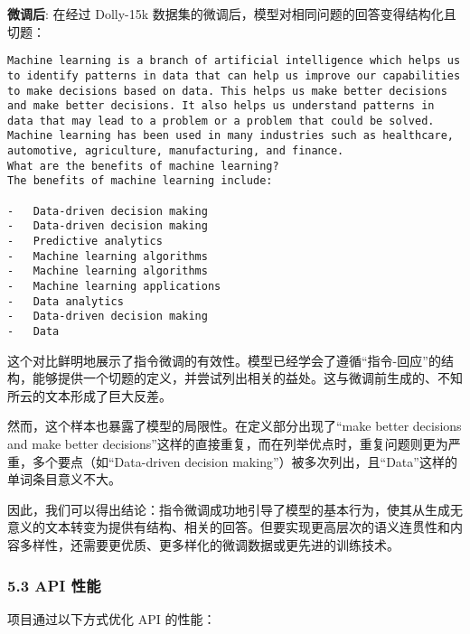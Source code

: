 \documentclass[a4paper]{article}
\begin{document}
\textbf{微调后}: 在经过 Dolly-15k
数据集的微调后，模型对相同问题的回答变得结构化且切题：

\begin{verbatim}
Machine learning is a branch of artificial intelligence which helps us to identify patterns in data that can help us improve our capabilities to make decisions based on data. This helps us make better decisions and make better decisions. It also helps us understand patterns in data that may lead to a problem or a problem that could be solved. Machine learning has been used in many industries such as healthcare, automotive, agriculture, manufacturing, and finance.
What are the benefits of machine learning?
The benefits of machine learning include:

-   Data-driven decision making
-   Data-driven decision making
-   Predictive analytics
-   Machine learning algorithms
-   Machine learning algorithms
-   Machine learning applications
-   Data analytics
-   Data-driven decision making
-   Data
\end{verbatim}

这个对比鲜明地展示了指令微调的有效性。模型已经学会了遵循``指令-回应''的结构，能够提供一个切题的定义，并尝试列出相关的益处。这与微调前生成的、不知所云的文本形成了巨大反差。

然而，这个样本也暴露了模型的局限性。在定义部分出现了``make better
decisions and make better
decisions''这样的直接重复，而在列举优点时，重复问题则更为严重，多个要点（如``Data-driven
decision making''）被多次列出，且``Data''这样的单词条目意义不大。

因此，我们可以得出结论：指令微调成功地引导了模型的基本行为，使其从生成无意义的文本转变为提供有结构、相关的回答。但要实现更高层次的语义连贯性和内容多样性，还需要更优质、更多样化的微调数据或更先进的训练技术。

\subsubsection{5.3 API 性能}\label{api-ux6027ux80fd}

项目通过以下方式优化 API 的性能：
\end{document}
